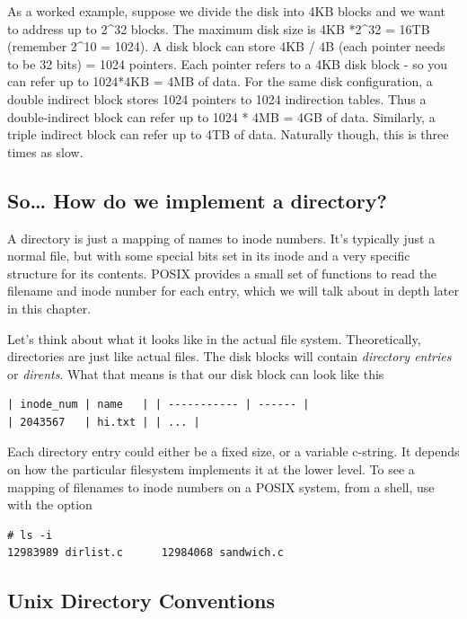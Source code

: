 As a worked example, suppose we divide the disk into 4KB blocks and we want to address up to 2\^{}32 blocks. The maximum disk size is 4KB *2\^{}32 = 16TB (remember 2\^{}10 = 1024). A disk block can store 4KB / 4B (each pointer needs to be 32 bits) = 1024 pointers. Each pointer refers to a 4KB disk block - so you can refer up to 1024*4KB = 4MB of data. For the same disk configuration, a double indirect block stores 1024 pointers to 1024 indirection tables. Thus a double-indirect block can refer up to 1024 * 4MB = 4GB of data. Similarly, a triple indirect block can refer up to 4TB of data. Naturally though, this is three times as slow.

\subsection{So\ldots{} How do we implement a directory?}\label{so-how-do-we-implement-a-directory}

A directory is just a mapping of names to inode numbers. It's typically just a normal file, but with some special bits set in its inode and a very specific structure for its contents. POSIX provides a small set of functions to read the filename and inode number for each entry, which we will talk about in depth later in this chapter.

Let's think about what it looks like in the actual file system. Theoretically, directories are just like actual files. The disk blocks will contain \emph{directory entries} or \emph{dirents}. What that means is that our disk block can look like this

\begin{lstlisting}
| inode_num | name   | | ----------- | ------ |
| 2043567   | hi.txt | | ... |
\end{lstlisting}

Each directory entry could either be a fixed size, or a variable c-string. It depends on how the particular filesystem implements it at the lower level. To see a mapping of filenames to inode numbers on a POSIX system, from a shell, use  with the  option

\begin{lstlisting}
# ls -i
12983989 dirlist.c      12984068 sandwich.c
\end{lstlisting}

\subsection{Unix Directory Conventions}

